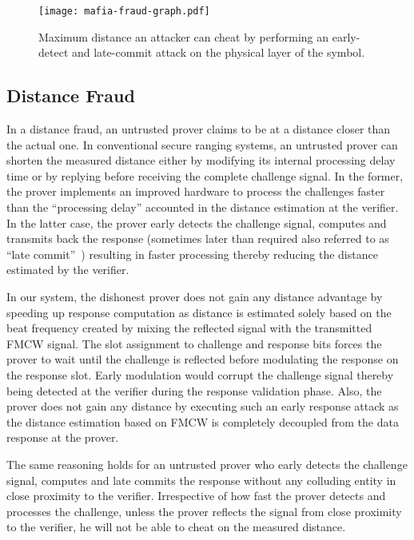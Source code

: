 \documentclass{sig-alternate-10pt}
\begin{document}
\begin{figure}[t]
  \centering
  \texttt{[image: mafia-fraud-graph.pdf]}
  \caption{Maximum distance an attacker can cheat by performing an
    early-detect and late-commit attack on the physical layer of the symbol.}
  \label{fig:mafia_fraud_plot}
\end{figure}


\subsection{Distance Fraud}
\label{subsec:distance-fraud}
In a distance fraud, an untrusted prover claims to be at a distance closer than
the actual one. In conventional secure ranging systems, an untrusted prover can
shorten the measured distance either by modifying its internal processing delay
time or by replying before receiving the complete challenge signal. In the
former, the prover implements an improved hardware to process the challenges
faster than the ``processing delay'' accounted in the distance estimation at the
verifier. In the latter case, the prover early detects the challenge signal,
computes and transmits back the response (sometimes later than required also
referred to as ``late commit''~\cite{ClulowSep06}) resulting in faster
processing thereby reducing the distance estimated by the verifier.

In our system, the dishonest prover does not
gain any distance advantage by speeding up response computation as distance is
estimated solely based on the beat frequency created by mixing the reflected
signal with the transmitted FMCW signal. The slot assignment to challenge and
response bits forces the prover to wait until the challenge is reflected before
modulating the response on the response slot. Early modulation would corrupt the
challenge signal thereby being detected at the verifier during the response
validation phase. Also, the prover does not gain any distance by executing such
an early response attack as the distance estimation based on FMCW is completely
decoupled from the data response at the prover.

The same reasoning holds for an untrusted prover who early detects the challenge
signal, computes and late commits the response without any colluding entity in
close proximity to the verifier. Irrespective of how fast the prover detects and
processes the challenge, unless the prover reflects the signal from close
proximity to the verifier, he will not be able to cheat on the measured
distance.
\end{document}
